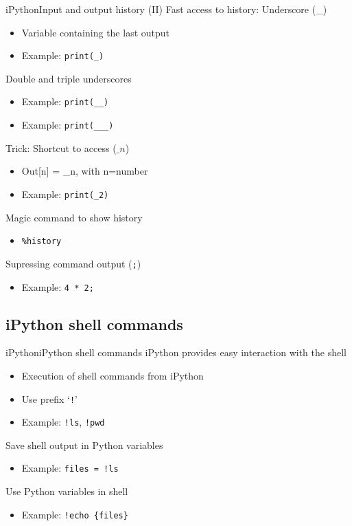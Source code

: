 \documentclass[10pt,compress]{beamer} %
\begin{document}
\begin{frame}{iPython}{Input and output history (II)}
	Fast access to history: Underscore (\_)
	\begin{itemize}
		\item Variable containing the last output
		\item Example: \texttt{print(\_)}
	\end{itemize}
	Double and triple underscores
	\begin{itemize}
		\item Example: \texttt{print(\_\_)}
		\item Example: \texttt{print(\_\_\_)}
	\end{itemize}
	Trick: Shortcut to access ($\_n$)
	\begin{itemize}
		\item Out[n] = \_n, with n=number
		\item Example: \texttt{print(\_2)}
	\end{itemize}
	Magic command to show history
		\begin{itemize}
		\item \texttt{\%history}
		\end{itemize}
	Supressing command output (\texttt{;})
		\begin{itemize}
		\item Example: \texttt{4 * 2;}
		\end{itemize}
\end{frame}

\subsection{iPython shell commands}
\begin{frame}{iPython}{iPython shell commands}
	iPython provides easy interaction with the shell
	\begin{itemize}
		\item Execution of shell commands from iPython
		\item Use prefix `\texttt{!}'
		\item Example: \texttt{!ls}, \texttt{!pwd}
	\end{itemize}
	Save shell output in Python variables
	\begin{itemize}
		\item Example: \texttt{files = !ls}
	\end{itemize}
	Use Python variables in shell
	\begin{itemize}
		\item Example: \texttt{!echo \{files\}}
	\end{itemize}
\end{frame}
\end{document}
